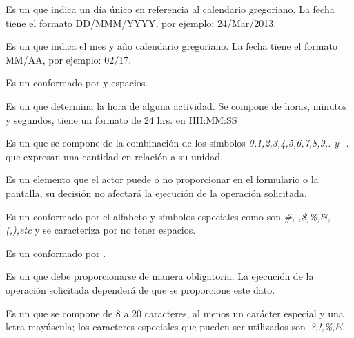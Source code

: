 \begin{description}
     Es un  que indica un día único en referencia al calendario gregoriano. La fecha tiene el formato DD/MMM/YYYY, por ejemplo: 24/Mar/2013.
    
      Es un  que indica el mes y año calendario gregoriano. La fecha tiene el formato MM/AA, por ejemplo: 02/17.

     Es un   conformado por  y espacios.
    
     Es un  que determina la hora de alguna actividad. Se compone de horas, minutos y segundos, tiene un formato de 24 hrs. en  HH:MM:SS 
    
     Es un  que se compone de la combinación de los símbolos \textit{0,1,2,3,4,5,6,7,8,9,. y -.}  que expresan una cantidad en relación a su unidad.
    
     Es un elemento que el actor puede o no proporcionar en el formulario o la pantalla, su decisión no afectará la ejecución de la operación solicitada.

     Es un   conformado por el alfabeto y símbolos especiales como son \textit{\#,-,\$,\%,\&,(,),etc} y se caracteriza por no tener espacios.
    
     Es un  conformado por .

     Es un  que debe proporcionarse de manera obligatoria. La ejecución de la operación solicitada dependerá de que se proporcione este dato.
    
     Es un  que se compone de 8 a 20 caracteres, al menos un carácter especial y una letra mayúscula; los caracteres especiales que pueden ser utilizados son \textit{\,?,!,\%,\&}.
    


\end{description}
